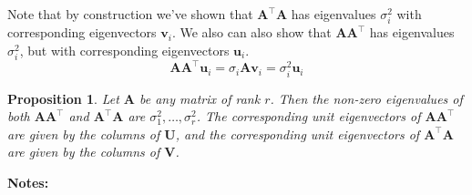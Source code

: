 \documentclass[]{book}
\newtheorem{proposition}{Proposition}[chapter]
\theoremstyle{definition}
\theoremstyle{definition}
\theoremstyle{definition}
\theoremstyle{remark}
\begin{document}
Note that by construction we've shown that \(\boldsymbol A^\top\boldsymbol A\) has eigenvalues \(\sigma^2_i\) with corresponding eigenvectors \(\boldsymbol v_i\). We also can also show that \(\boldsymbol A\boldsymbol A^\top\) has eigenvalues \(\sigma^2_i\), but with corresponding eigenvectors \(\boldsymbol u_i\).
\[\boldsymbol A\boldsymbol A^\top \boldsymbol u_i = \sigma_i\boldsymbol A\boldsymbol v_i = \sigma^2_i \boldsymbol u_i\]

\begin{proposition}
\protect\hypertarget{prp:SVDeigen}{}{\label{prp:SVDeigen} }Let \(\boldsymbol A\) be any matrix of rank \(r\). Then the non-zero eigenvalues of both \(\boldsymbol A\boldsymbol A^\top\) and \(\boldsymbol A^\top \boldsymbol A\) are \(\sigma_1^2, \ldots , \sigma_r^2\). The corresponding unit eigenvectors of \(\boldsymbol A\boldsymbol A^\top\) are given by the columns of \(\boldsymbol U\), and the corresponding unit eigenvectors of \(\boldsymbol A^\top \boldsymbol A\) are given by the columns of \(\mathbf V\).
\end{proposition}

\textbf{Notes:}
\end{document}

